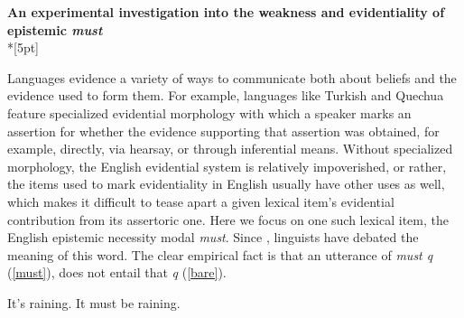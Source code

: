 \documentclass[11pt]{article}
\newcommand{\red}[1]{\textcolor{Red}{#1}}
\begin{document}
\begin{center}\textbf{An experimental investigation into the weakness and evidentiality of epistemic \emph{must}}\\*[5pt]
\end{center}

\vspace{-11pt}


Languages evidence a variety of ways to communicate both about beliefs and the evidence used to form them. For example, languages like Turkish %
and Quechua %
feature specialized evidential morphology with which a speaker marks an assertion for whether the evidence supporting that assertion was obtained, for example, directly, via hearsay, or through inferential means. Without specialized morphology, the English evidential system is relatively impoverished, or rather, the items used to mark evidentiality in English usually have other uses as well, which makes it difficult to tease apart a given lexical item's evidential contribution from its assertoric one. Here we focus on one such lexical item, the English epistemic necessity modal \emph{must}. Since \citep{karttunen1972}, linguists have debated the meaning of this word. The clear empirical fact is that an utterance of \emph{must q} (\ref{must}), does not entail that \emph{q} (\ref{bare}). 


\vspace{-8pt}
\begin{exe}
\ex\label{inference} 
\begin{xlist}
\ex\label{bare}  It's raining.
\ex\label{must} It must be raining.
\end{xlist}
\end{exe}
\vspace{-8pt}
\end{document}
